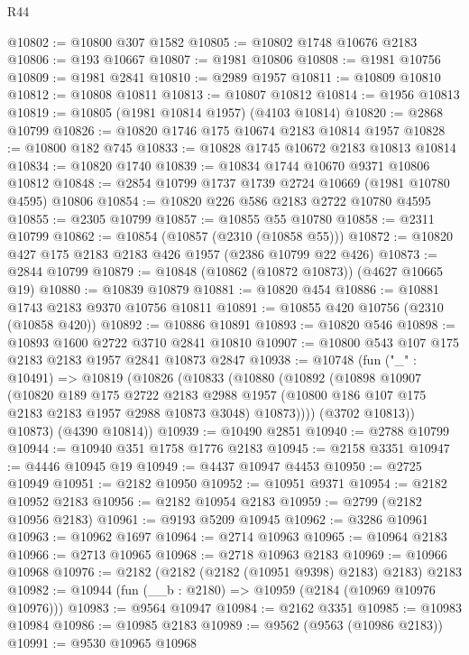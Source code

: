 \begin{lexlean}{R44}
\begin{coremodule}
@10802 := @10800 @307 @1582
@10805 := @10802 @1748 @10676 @2183
@10806 := @193 @10667
@10807 := @1981 @10806
@10808 := @1981 @10756
@10809 := @1981 @2841
@10810 := @2989 @1957
@10811 := @10809 @10810
@10812 := @10808 @10811
@10813 := @10807 @10812
@10814 := @1956 @10813
@10819 := @10805 (@1981 @10814 @1957) (@4103 @10814)
@10820 := @2868 @10799
@10826 := @10820 @1746 @175 @10674 @2183 @10814 @1957
@10828 := @10800 @182 @745
@10833 := @10828 @1745 @10672 @2183 @10813 @10814
@10834 := @10820 @1740
@10839 := @10834 @1744 @10670 @9371 @10806 @10812
@10848 := @2854 @10799 @1737 @1739 @2724 @10669 (@1981 @10780 @4595) @10806
@10854 := @10820 @226 @586 @2183 @2722 @10780 @4595
@10855 := @2305 @10799
@10857 := @10855 @55 @10780
@10858 := @2311 @10799
@10862 := @10854 (@10857 (@2310 (@10858 @55)))
@10872 := @10820 @427 @175 @2183 @2183 @426 @1957 (@2386 @10799 @22 @426)
@10873 := @2844 @10799
@10879 := @10848 (@10862 (@10872 @10873)) (@4627 @10665 @19)
@10880 := @10839 @10879
@10881 := @10820 @454
@10886 := @10881 @1743 @2183 @9370 @10756 @10811
@10891 := @10855 @420 @10756 (@2310 (@10858 @420))
@10892 := @10886 @10891
@10893 := @10820 @546
@10898 := @10893 @1600 @2722 @3710 @2841 @10810
@10907 := @10800 @543 @107 @175 @2183 @2183 @1957 @2841 @10873 @2847
@10938 := @10748
    (fun ("_" : @10491) =>
    @10819
      (@10826
        (@10833
          (@10880
            (@10892
              (@10898
                @10907
                (@10820
                  @189
                  @175
                  @2722
                  @2183
                  @2988
                  @1957
                  (@10800 @186 @107 @175 @2183 @2183 @1957 @2988 @10873 @3048)
                  @10873))))
          (@3702 @10813))
        @10873)
      (@4390 @10814))
@10939 := @10490 @2851
@10940 := @2788 @10799
@10944 := @10940 @351 @1758 @1776 @2183
@10945 := @2158 @3351
@10947 := @4446 @10945 @19
@10949 := @4437 @10947 @4453
@10950 := @2725 @10949
@10951 := @2182 @10950
@10952 := @10951 @9371
@10954 := @2182 @10952 @2183
@10956 := @2182 @10954 @2183
@10959 := @2799 (@2182 @10956 @2183)
@10961 := @9193 @5209 @10945
@10962 := @3286 @10961
@10963 := @10962 @1697
@10964 := @2714 @10963
@10965 := @10964 @2183
@10966 := @2713 @10965
@10968 := @2718 @10963 @2183
@10969 := @10966 @10968
@10976 := @2182 (@2182 (@2182 (@10951 @9398) @2183) @2183) @2183
@10982 := @10944 (fun (__b : @2180) => @10959 (@2184 (@10969 @10976 @10976)))
@10983 := @9564 @10947
@10984 := @2162 @3351
@10985 := @10983 @10984
@10986 := @10985 @2183
@10989 := @9562 (@9563 (@10986 @2183))
@10991 := @9530 @10965 @10968

\end{coremodule}
\end{lexlean}
